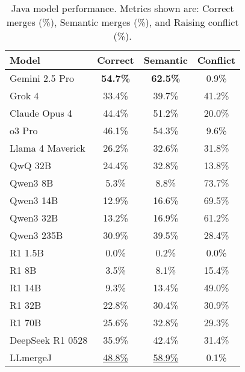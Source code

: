 \begin{table}[ht]
\centering
\footnotesize
\begin{tabular}{lccc}
\toprule
Model & Correct & Semantic & Conflict \\
\midrule
Gemini 2.5 Pro & \textbf{54.7\%} & \textbf{62.5\%} & 0.9\% \\
Grok 4 & 33.4\% & 39.7\% & 41.2\% \\
Claude Opus 4 & 44.4\% & 51.2\% & 20.0\% \\
o3 Pro & 46.1\% & 54.3\% & 9.6\% \\
Llama 4 Maverick & 26.2\% & 32.6\% & 31.8\% \\
QwQ 32B & 24.4\% & 32.8\% & 13.8\% \\
Qwen3 8B & 5.3\% & 8.8\% & 73.7\% \\
Qwen3 14B & 12.9\% & 16.6\% & 69.5\% \\
Qwen3 32B & 13.2\% & 16.9\% & 61.2\% \\
Qwen3 235B & 30.9\% & 39.5\% & 28.4\% \\
R1 1.5B & 0.0\% & 0.2\% & 0.0\% \\
R1 8B & 3.5\% & 8.1\% & 15.4\% \\
R1 14B & 9.3\% & 13.4\% & 49.0\% \\
R1 32B & 22.8\% & 30.4\% & 30.9\% \\
R1 70B & 25.6\% & 32.8\% & 29.3\% \\
DeepSeek R1 0528 & 35.9\% & 42.4\% & 31.4\% \\
LLmergeJ & \underline{48.8\%} & \underline{58.9\%} & 0.1\% \\
\bottomrule
\end{tabular}
\caption{Java model performance. Metrics shown are: Correct merges (\%), Semantic merges (\%), and Raising conflict (\%).}
\label{tab:java-results}
\end{table}
